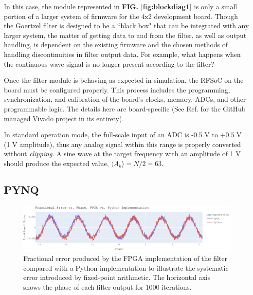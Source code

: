 \documentclass[reprint,amsmath,amssymb,aps,pra]{revtex4-2}
\begin{document}
In this case, the module represented in \textbf{FIG. \ref{fig:blockdiag1}} is only a small portion of a larger system of firmware for the 4x2 development board. Though the Goertzel filter is designed to be a ``black box" that can be integrated with any larger system, the matter of getting data to and from the filter, as well as output handling, is dependent on the existing firmware and the chosen methods of handling discontinuities in filter output data. For example, what happens when the continuous wave signal is no longer present according to the filter?

Once the filter module is behaving as expected in simulation, the RFSoC on the board must be configured properly. This process includes the programming, synchronization, and calibration of the board's clocks, memory, ADCs, and other programmable logic. The details here are board-specific (See Ref. \cite{github} for the GitHub managed Vivado project in its entirety).

In standard operation mode, the full-scale input of an ADC is -0.5 V to +0.5 V (1 V amplitude), thus any analog signal within this range is properly converted without \textit{clipping}. A sine wave at the target frequency with an amplitude of 1 V should produce the expected value, $\langle A_k\rangle = N/2 = 63$.

\subsection{PYNQ}

\begin{figure}[t]
    \centering
    \includegraphics[width=\linewidth]{figs/pythonvfpga.png}
    \caption{Fractional error produced by the FPGA implementation of the filter compared with a Python implementation to illustrate the systematic error introduced by fixed-point arithmetic. The horizontal axis shows the phase of each filter output for 1000 iterations.}
    \label{fig:fracerror1}
\end{figure}
\end{document}
